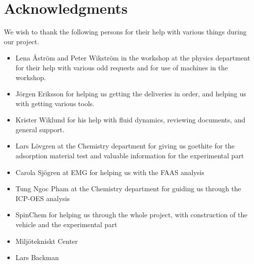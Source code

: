 \section*{Acknowledgments}
We wish to thank the following persons for their help with various things during our project.
\begin{itemize}
\item Lena Åström and Peter Wikström in the workshop at the physics department for their help with various odd requests and for use of machines in the workshop.

\item   Jörgen Eriksson for helping us getting the deliveries in order, and helping us with getting various tools.

\item   Krister Wiklund for his help with fluid dynamics, reviewing documents, and general support.

\item   Lars Lövgren at the Chemistry department for giving us goethite for the adsorption material test and valuable information for the experimental part



\item   Carola Sjögren at EMG for helping us with the FAAS analysis
 
\item   Tung Ngoc Pham at the Chemistry department for guiding us through the ICP-OES analysis 

\item   SpinChem for helping us through the whole project, with construction of the vehicle and the experimental part

\item   Miljötekniskt Center

\item   Lars Backman

\end{itemize}

